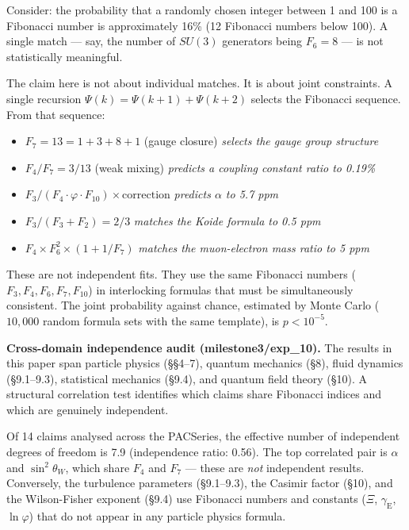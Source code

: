 \documentclass[
  11pt,
  a4paper]{article}
\providecommand{\tightlist}{%
  \setlength{\itemsep}{0pt}\setlength{\parskip}{0pt}}
\begin{document}
Consider: the probability that a randomly chosen integer between 1 and
100 is a Fibonacci number is approximately 16\% (12 Fibonacci numbers
below 100). A single match --- say, the number of \(SU(3)\) generators
being \(F_6 = 8\) --- is not statistically meaningful.

The claim here is not about individual matches. It is about joint
constraints. A single recursion \(\Psi(k) = \Psi(k+1) + \Psi(k+2)\)
selects the Fibonacci sequence. From that sequence:

\begin{itemize}
\tightlist
\item
  \(F_7 = 13 = 1 + 3 + 8 + 1\) (gauge closure) \emph{selects the gauge
  group structure}
\item
  \(F_4/F_7 = 3/13\) (weak mixing) \emph{predicts a coupling constant
  ratio to 0.19\%}
\item
  \(F_3/(F_4 \cdot \varphi \cdot F_{10}) \times \text{correction}\)
  \emph{predicts \(\alpha\) to 5.7 ppm}
\item
  \(F_3/(F_3 + F_2) = 2/3\) \emph{matches the Koide formula to 0.5 ppm}
\item
  \(F_4 \times F_6^2 \times (1 + 1/F_7)\) \emph{matches the
  muon-electron mass ratio to 5 ppm}
\end{itemize}

These are not independent fits. They use the same Fibonacci numbers
(\(F_3, F_4, F_6, F_7, F_{10}\)) in interlocking formulas that must be
simultaneously consistent. The joint probability against chance,
estimated by Monte Carlo (\(10{,}000\) random formula sets with the same
template), is \(p < 10^{-5}\).

\textbf{Cross-domain independence audit (milestone3/exp\_10).} The
results in this paper span particle physics (§§4--7), quantum mechanics
(§8), fluid dynamics (§9.1--9.3), statistical mechanics (§9.4), and
quantum field theory (§10). A structural correlation test identifies
which claims share Fibonacci indices and which are genuinely
independent.

Of 14 claims analysed across the PACSeries, the effective number of
independent degrees of freedom is 7.9 (independence ratio: 0.56). The
top correlated pair is \(\alpha\) and \(\sin^2\theta_W\), which share
\(F_4\) and \(F_7\) --- these are \emph{not} independent results.
Conversely, the turbulence parameters (§9.1--9.3), the Casimir factor
(§10), and the Wilson-Fisher exponent (§9.4) use Fibonacci numbers and
constants (\(\Xi\), \(\gamma_{\mathrm{E}}\), \(\ln\varphi\)) that do not
appear in any particle physics formula.
\end{document}
